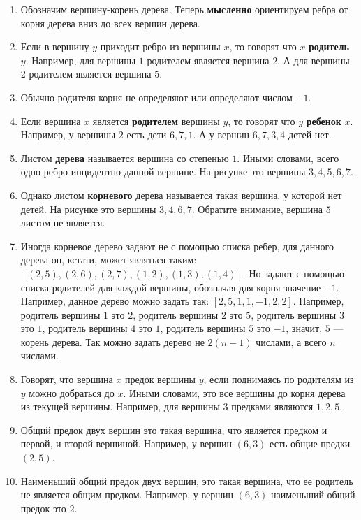 \documentclass[../../main.tex]{subfiles}
\begin{document}
\begin{enumerate}
    \item Обозначим вершину-корень дерева. Теперь \textbf{мысленно} ориентируем ребра от корня дерева вниз до всех вершин дерева. 
    \item Если в вершину $y$ приходит ребро из вершины $x$, то говорят что $x$ \textbf{родитель} $y$. Например, для вершины $1$ родителем является вершина $2$. 
    А для вершины $2$ родителем является вершина $5$.
    \item Обычно родителя корня не определяют или определяют числом $-1$. 
    \item Если вершина $x$ является \textbf{родителем} вершины $y$, то говорят что $y$ \textbf{ребенок} $x$. Например, у вершины $2$ есть дети $6,7,1$. 
    А у вершин $6,7,3,4$ детей нет. 
    \item Листом \textbf{дерева} называется вершина со степенью $1$. Иными словами, всего одно ребро инцидентно данной вершине. На рисунке 
    это вершины $3,4,5,6,7$.
    \item Однако листом \textbf{корневого} дерева называется такая вершина, у которой нет детей. На рисунке 
    это вершины $3,4,6,7$. Обратите внимание, вершина $5$ листом не является. 
    \item Иногда корневое дерево задают не с помощью списка ребер, для данного дерева он, кстати, может являться таким: $[(2,5), (2,6), (2,7), (1,2), (1,3), (1,4)]$. 
    Но задают с помощью списка родителей для каждой вершины, обозначая для корня значение $-1$. Например, данное дерево 
    можно задать так: $[2, 5, 1, 1, -1, 2, 2]$. Например, родитель вершины $1$ это $2$, родитель вершины $2$ это $5$, родитель вершины $3$ это $1$, родитель вершины $4$ это $1$,
    родитель вершины $5$ это $-1$, значит, $5$ --- корень дерева. 
    Так можно задать дерево не $2(n-1)$ числами, а всего $n$ числами.
    \item Говорят, что вершина $x$ предок вершины $y$, если поднимаясь по родителям из $y$ можно добраться до $x$. Иными словами, это все вершины до корня дерева из текущей вершины. 
    Например, для вершины $3$ предками являются $1,2,5$. 
    \item Общий предок двух вершин это такая вершина, что является предком и первой, и второй вершиной. Например, у вершин $(6,3)$ есть общие предки $(2,5)$. 
    \item Наименьший общий предок двух вершин, это такая вершина, что ее родитель не является общим предком. Например, у вершин $(6,3)$ наименьший общий предок это $2$. 
\end{enumerate}
\end{document}
